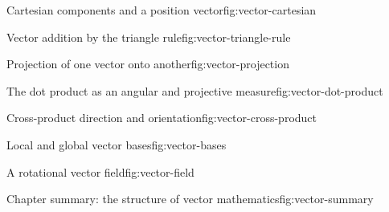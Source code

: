 
\begin{bookfigure}{Cartesian components and a position vector}{fig:vector-cartesian}
  
\end{bookfigure}

\begin{bookfigure}{Vector addition by the triangle rule}{fig:vector-triangle-rule}
  
\end{bookfigure}

\begin{bookfigure}{Projection of one vector onto another}{fig:vector-projection}
  
\end{bookfigure}

\begin{bookfigure}{The dot product as an angular and projective measure}{fig:vector-dot-product}
  
\end{bookfigure}

\begin{bookfigure}{Cross-product direction and orientation}{fig:vector-cross-product}
  
\end{bookfigure}

\begin{bookfigure}{Local and global vector bases}{fig:vector-bases}
  
\end{bookfigure}

\begin{bookfigure}{A rotational vector field}{fig:vector-field}
  
\end{bookfigure}

\begin{bookfigure}{Chapter summary: the structure of vector mathematics}{fig:vector-summary}
  
\end{bookfigure}
